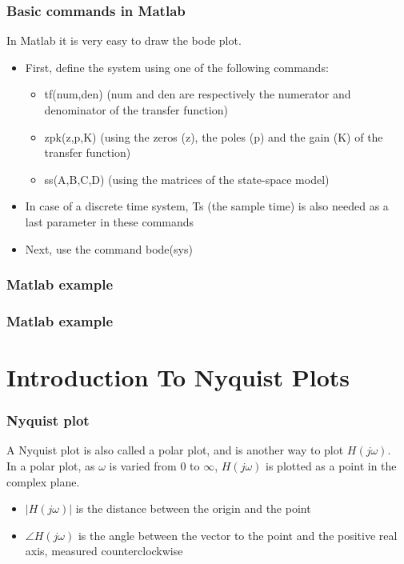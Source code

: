 \begin{frame}
\frametitle{Basic commands in Matlab}

In Matlab it is very easy to draw the bode plot.
\begin{itemize}
\item First, define the system using one of the following commands:
	\begin{itemize}
	\item tf(num,den) (num and den are respectively the numerator and denominator of the transfer function)
	\item zpk(z,p,K) (using the zeros (z), the poles (p) and the gain (K) of the transfer function)
	\item ss(A,B,C,D) (using the matrices of the state-space model)

	\end{itemize}
\item In case of a discrete time system, Ts (the sample time) is also needed as a last parameter in these commands
\item Next, use the command bode(sys)

\end{itemize}

\end{frame}

\begin{frame}
\frametitle{Matlab example}

\end{frame}

\begin{frame}
\frametitle{Matlab example}

\end{frame}


\section{Introduction To Nyquist Plots}
\begin{frame}
\frametitle{Nyquist plot}
A Nyquist plot is also called a polar plot, and is another way to plot $H(j\omega)$.\\
In a polar plot, as $\omega$ is varied from 0 to $\infty$, $H(j\omega)$ is plotted as a point in the complex plane.
\begin{itemize}
\item $|H(j\omega)|$ is the distance between the origin and the point
\item $\angle H(j\omega)$ is the angle between the vector to the point and the positive real axis, measured counterclockwise 
\end{itemize}

\end{frame}

